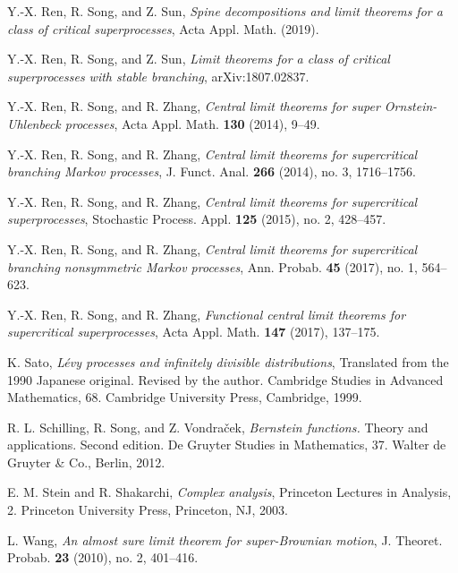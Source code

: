 \documentclass[12pt,a4paper]{amsart}
\theoremstyle{plain}
\theoremstyle{definition}
\numberwithin{equation}{section}
\begin{document}
\begin{thebibliography}{10}
  Y.-X. Ren, R. Song, and Z. Sun,
  \emph{Spine decompositions and limit theorems for a class of critical superprocesses},
  Acta Appl. Math. (2019).

  Y.-X. Ren, R. Song, and Z. Sun,
  \emph{Limit theorems for a class of critical superprocesses with stable branching},
  arXiv:1807.02837.

  Y.-X. Ren, R. Song, and R. Zhang,
  \emph{Central limit theorems for super {O}rnstein-{U}hlenbeck processes},
  Acta Appl. Math. \textbf{130} (2014), 9--49.

  Y.-X. Ren, R. Song, and R. Zhang,
  \emph{Central limit theorems for supercritical branching {M}arkov processes},
  J. Funct. Anal. \textbf{266} (2014), no. 3, 1716--1756.

  Y.-X. Ren, R. Song, and R. Zhang,
  \emph{Central limit theorems for supercritical superprocesses},
  Stochastic Process. Appl. \textbf{125} (2015), no. 2, 428--457.

  Y.-X. Ren, R. Song, and R. Zhang,
  \emph{Central limit theorems for supercritical branching nonsymmetric {M}arkov processes},
  Ann. Probab. \textbf{45} (2017), no. 1, 564--623.

  Y.-X. Ren, R. Song, and R. Zhang,
  \emph{Functional central limit theorems for supercritical superprocesses},
  Acta Appl. Math. \textbf{147} (2017), 137--175.

  K. Sato,
  \emph{L{\'e}vy processes and infinitely divisible distributions},
  Translated from the 1990 Japanese original. Revised by the author. Cambridge Studies in Advanced Mathematics, 68. Cambridge University Press, Cambridge, 1999.

  R. L. Schilling, R. Song, and Z. Vondra\v{c}ek,
  \emph{Bernstein functions.}
  Theory and applications. Second edition. De Gruyter Studies in Mathematics, 37. Walter de Gruyter \& Co., Berlin, 2012.

  E. M. Stein and R. Shakarchi, \emph{Complex analysis},
  Princeton Lectures in Analysis, 2. Princeton University Press, Princeton, NJ, 2003.

  L. Wang, \emph{An almost sure limit theorem for super-{B}rownian motion},
  J. Theoret. Probab. \textbf{23} (2010), no. 2, 401--416.

\end{thebibliography}
\end{document}
